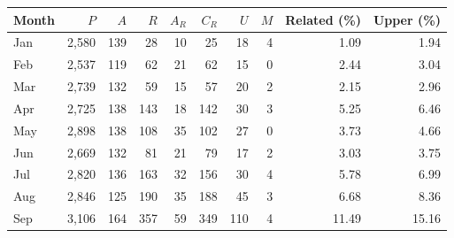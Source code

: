 \caption{Historical monthly posts/contributors: retrieved $P,A$, related $R,A_R$. $C_R$: complete related posts; $U$: uncertain relevance; $M$: unavailable text. Related share $100R/P$; allocation upper bound $100(R+U+M)/P$ (not a confidence limit).}
\label{tab:monthly_attention}
\centering
\begin{tabular}{lrrrrrrrrr}
\toprule
Month & $P$ & $A$ & $R$ & $A_R$ & $C_R$ & $U$ & $M$ & Related (\%) & Upper (\%)\\
\midrule
Jan & 2,580 & 139 & 28 & 10 & 25 & 18 & 4 & 1.09 & 1.94\\
Feb & 2,537 & 119 & 62 & 21 & 62 & 15 & 0 & 2.44 & 3.04\\
Mar & 2,739 & 132 & 59 & 15 & 57 & 20 & 2 & 2.15 & 2.96\\
Apr & 2,725 & 138 & 143 & 18 & 142 & 30 & 3 & 5.25 & 6.46\\
May & 2,898 & 138 & 108 & 35 & 102 & 27 & 0 & 3.73 & 4.66\\
Jun & 2,669 & 132 & 81 & 21 & 79 & 17 & 2 & 3.03 & 3.75\\
Jul & 2,820 & 136 & 163 & 32 & 156 & 30 & 4 & 5.78 & 6.99\\
Aug & 2,846 & 125 & 190 & 35 & 188 & 45 & 3 & 6.68 & 8.36\\
Sep & 3,106 & 164 & 357 & 59 & 349 & 110 & 4 & 11.49 & 15.16\\
\bottomrule
\end{tabular}

